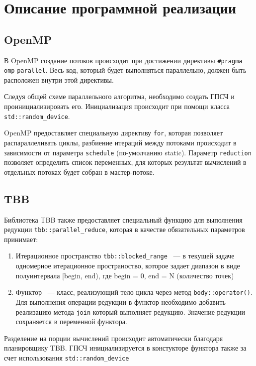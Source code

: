 \documentclass{report}
\begin{document}
\section*{Описание программной реализации}
\subsection*{OpenMP}
\par В OpenMP создание потоков происходит при достижении директивы \verb|#pragma omp| \verb|parallel|. Весь код, который будет выполняться параллельно, должен быть расположен внутри этой директивы.
\par Следуя общей схеме параллельного алгоритма, необходимо создать ГПСЧ и проинициализировать его. Инициализация происходит при помощи класса \verb|std::random_device|.
\par OpenMP предоставляет специальную директиву \verb|for|, которая позволяет распараллеливать циклы, разбиение итераций между потоками происходит в зависимости от параметра \verb|schedule| (по-умолчанию static). Параметр \verb|reduction| позволяет определить список переменных, для которых результат вычислений в отдельных потоках будет собран в мастер-потоке.

\subsection*{TBB}
Библиотека TBB также предоставляет специальный функцию для выполнения редукции \verb|tbb::parallel_reduce|, которая в качестве обязательных параметров принимает:
 \begin{enumerate}
\item Итерационное пространство \verb|tbb::blocked_range|  ~--- в текущей задаче одномерное итерационное пространоство, которое задает диапазон в виде
полуинтервала [begin, end), где begin = 0, end = N (количество точек)
\item Функтор ~--- класс, реализующий тело цикла через метод \verb|body::operator()|. Для выполнения операции редукции в функтор необходимо добавить реализацию метода \verb|join| который выполняет редукцию. Значение редукции сохраняется в переменной функтора.
\end{enumerate}
Разделение на порции вычислений происходит автоматически благодаря планировщику TBB. ГПСЧ инициализируется в констукторе функтора также за счет использования \verb|std::random_device|
\end{document}
